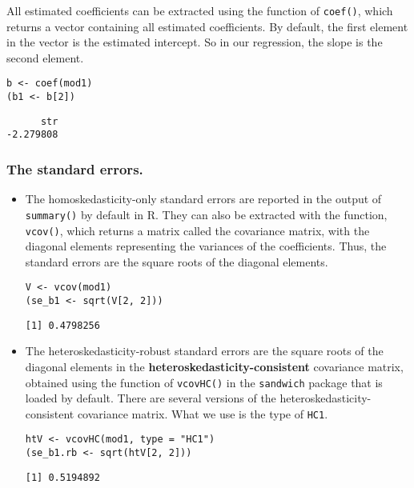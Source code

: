 \documentclass[11pt]{article}
\begin{document}
All estimated coefficients can be extracted using the function of
\texttt{coef()}, which returns a vector containing all estimated
coefficients. By default, the first element in the vector is the
estimated intercept. So in our regression, the slope is the second
element.

\begin{verbatim}
b <- coef(mod1)
(b1 <- b[2])
\end{verbatim}

\begin{verbatim}
      str
-2.279808
\end{verbatim}

\subsubsection*{The standard errors.}
\label{sec:orgfe16122}

\begin{itemize}
\item The homoskedasticity-only standard errors are reported in the output
of \texttt{summary()} by default in R. They can also be extracted with the
function, \texttt{vcov()}, which returns a matrix called the covariance
matrix, with the diagonal elements representing the variances of the
coefficients. Thus, the standard errors are the square roots of
the diagonal elements.

\begin{verbatim}
V <- vcov(mod1)
(se_b1 <- sqrt(V[2, 2]))
\end{verbatim}

\begin{verbatim}
[1] 0.4798256
\end{verbatim}

\item The heteroskedasticity-robust standard errors are the square roots
of the diagonal elements in the \textbf{heteroskedasticity-consistent}
covariance matrix, obtained using the function of \texttt{vcovHC()} in
the \texttt{sandwich} package that is loaded by default. There are several
versions of the heteroskedasticity-consistent covariance
matrix. What we use is the type of \texttt{HC1}.

\begin{verbatim}
htV <- vcovHC(mod1, type = "HC1")
(se_b1.rb <- sqrt(htV[2, 2]))
\end{verbatim}

\begin{verbatim}
[1] 0.5194892
\end{verbatim}
\end{itemize}
\end{document}
